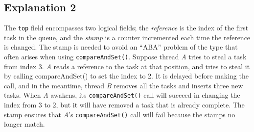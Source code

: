 \subsection{Explanation 2}

The \lstinline!top! field encompasses two logical fields; the
\emph{reference} is the index of the first task in the queue, and the
\emph{stamp} is a counter incremented each time the reference is
changed. The stamp is needed to avoid an ``ABA'' problem of the type
that often arises when using \lstinline!compareAndSet()!. Suppose
thread \emph{A} tries to steal a task from index 3.  \emph{A} reads a
reference to the task at that position, and tries to steal it by
calling compareAndSet() to set the index to 2. It is delayed before
making the call, and in the meantime, thread \emph{B} removes all the
tasks and inserts three new tasks. When \emph{A} awakens, its
\lstinline!compareAndSet()!  call will succeed in changing the index
from 3 to 2, but it will have removed a task that is already
complete. The stamp ensures that \emph{A}'s
\lstinline!compareAndSet()! call will fail because the stamps no
longer match.


